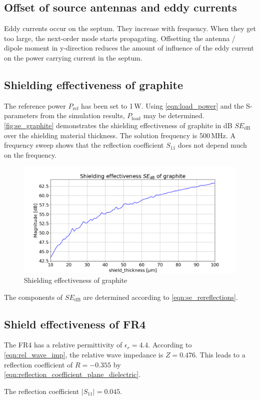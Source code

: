 \subsection{Offset of source antennas and eddy currents}

Eddy currents occur on the septum. They increase with frequency. When they get too large, the next-order mode starts propagating. Offsetting the antenna / dipole moment in y-direction reduces the amount of influence of the eddy current on the power carrying current in the septum. 


\subsection{Shielding effectiveness of graphite}

The reference power $P_\mathrm{ref}$ has been set to 1\,W. Using \autoref{eqn:load_power} and the S-parameters from the simulation results, $P_\mathrm{load}$ may be determined. \autoref{fig:se_graphite} demonstrates the shielding effectiveness of graphite in dB $SE_\mathrm{dB}$ over the shielding material thickness. The solution frequency is 500\,MHz. A frequency sweep shows that the reflection coefficient $S_{11}$ does not depend much on the frequency. 

\begin{figure}[h]
    \centering
    \includegraphics[width=1\linewidth]{Documentation//content//30_simulations//img/se_graphite.png}
    \caption{Shielding effectiveness of graphite}
    \label{fig:se_graphite}
\end{figure}


The components of $SE_\mathrm{dB}$ are determined according to \autoref{eqn:se_rereflections}. 

\subsection{Shield effectiveness of FR4}

The FR4 has a relative permittivity of $\epsilon_r=4.4$. According to \autoref{eqn:rel_wave_imp}, the relative wave impedance is $Z=0.476$. This leads to a reflection coefficient of $R=-0.355$ by \autoref{eqn:reflection_coefficient_plane_dielectric}.


The reflection coefficient $|S_{11}|=0.045$.
